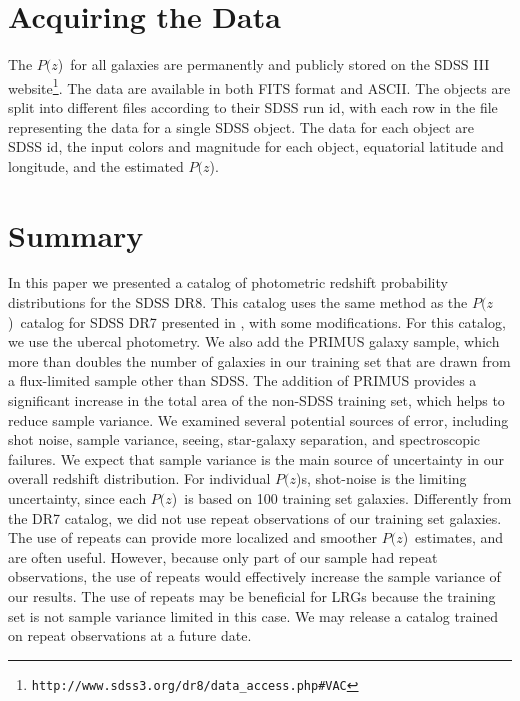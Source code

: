 \documentclass[preprint]{aastex}
\newcommand{\pofz}{$P(z$)}
\newcommand{\downloadURL}{{\tt http://www.sdss3.org/dr8/data\_access.php\#VAC}}
\begin{document}
\section{Acquiring the Data} \label{sec:get}

The \pofz\ for all galaxies are permanently and publicly stored on the SDSS III
website\footnote{\downloadURL}.  The data are available in both FITS format and
ASCII.  The objects are split into different files according to their SDSS run
id, with each row in the file representing the data for a single SDSS object.
The data for each object are SDSS id, the input colors and magnitude for each
object, equatorial latitude and longitude, and the estimated \pofz.


\section{Summary} \label{sec:summary}

In this paper we presented a catalog of photometric redshift probability distributions for
the SDSS DR8.  This catalog uses the same method as the \pofz\ catalog for SDSS
DR7 presented in \cite{CunhaPhotoz09}, with some modifications.  For this
catalog, we use the ubercal photometry.  We also add the PRIMUS galaxy sample,
which more than doubles the number of galaxies in our training set that are
drawn from a flux-limited sample other than SDSS.  The addition of PRIMUS
provides a significant increase in the total area of the non-SDSS training set, which
helps to reduce sample variance.  We examined several potential sources of
error, including shot noise, sample variance, seeing, star-galaxy separation,
and spectroscopic failures.  We expect that sample variance is the main source
of uncertainty in our overall redshift distribution.  For individual \pofz s,
shot-noise is the limiting uncertainty, since each \pofz\ is based on 100 training set galaxies.  
Differently from the DR7 catalog, we
did not use repeat observations of our training set galaxies.  The use of
repeats can provide more localized and smoother \pofz\ estimates, and are often
useful.  However, because only part of our sample had repeat observations, the
use of repeats would effectively increase the sample variance of our results.
The use of repeats may be beneficial for LRGs because the training set is not
sample variance limited in this case.  We may release a catalog trained on
repeat observations at a future date.  
\end{document}
